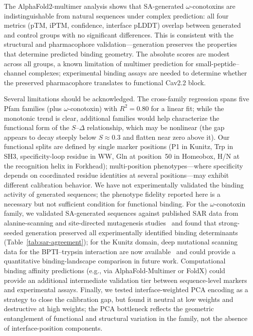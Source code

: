 The AlphaFold2-multimer analysis shows that SA-generated $\omega$-conotoxins are
indistinguishable from natural sequences under complex prediction: all four metrics (pTM, iPTM,
confidence, interface pLDDT) overlap between generated and control groups with no significant
differences. This is consistent with the structural and pharmacophore validation---generation
preserves the properties that determine predicted binding geometry. The absolute scores are
modest across all groups, a known limitation of multimer prediction for small-peptide--channel
complexes; experimental binding assays are needed to determine whether the preserved
pharmacophore translates to functional Cav2.2 block.

Several limitations should be acknowledged. The cross-family regression spans five Pfam families
(plus $\omega$-conotoxin) with $R^{2} = 0.80$ for a linear fit; while the monotonic trend is
clear, additional families would help characterize the functional form of the $S$--$\Delta$
relationship, which may be nonlinear (the gap appears to decay steeply below $S \approx 0.3$
and flatten near zero above it). Our functional splits are defined by single marker positions
(P1 in Kunitz, Trp in SH3, specificity-loop residue in WW, Gln at position~50 in Homeobox,
H/N at the recognition helix in Forkhead); multi-position phenotypes---where specificity depends
on coordinated residue identities at several positions---may exhibit different calibration
behavior. We have not experimentally
validated the binding activity of generated sequences; the phenotype fidelity reported here is a
necessary but not sufficient condition for functional binding. For the $\omega$-conotoxin family,
we validated SA-generated sequences against published SAR data from alanine-scanning and
site-directed mutagenesis studies~\cite{kimTyr13Essential1995,satoBasicResidues1993,lewisConotoxinSAR2012}
and found that strong-seeded generation preserved all experimentally identified binding
determinants (Table~\ref{tab:sar-agreement}); for the Kunitz domain, deep mutational scanning
data for the BPTI--trypsin interaction are now
available~\cite{heyneBPTIDMS2021} and could provide a quantitative binding-landscape comparison
in future work. Computational binding affinity predictions (e.g., via AlphaFold-Multimer or
FoldX) could provide an additional intermediate validation tier between sequence-level markers
and experimental assays. Finally, we tested interface-weighted PCA
encoding as a strategy to close the calibration gap, but found it neutral at low weights and
destructive at high weights; the PCA bottleneck reflects the geometric entanglement of functional
and structural variation in the family, not the absence of interface-position components.

